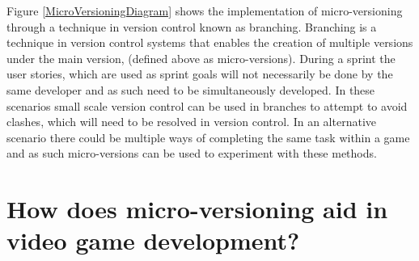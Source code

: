 \documentclass{scrartcl}
\begin{document}
Figure \ref{MicroVersioningDiagram} shows the implementation  of micro-versioning through a technique in version control known as branching. Branching is a technique in version control systems that enables the creation of multiple versions under the main version, (defined above as micro-versions)\cite{chacon2014pro}. During a sprint the user stories, which are used as sprint goals will not necessarily be done by the same developer and as such need to be simultaneously developed. In these scenarios small scale version control can be used in branches to attempt to avoid clashes, which will need to be resolved in version control. In an alternative scenario there could be multiple ways of completing the same task within a game and as such micro-versions can be used to experiment with these methods.


\section{How does micro-versioning aid in video game development?}
\end{document}

